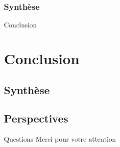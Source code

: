 \documentclass[english,french,dvips]{mybeamer}
\begin{document}
	\subsubsection{Synthèse}
	\begin{frame}{Conclusion}
	\end{frame}
	\section{Conclusion}
	\subsection{Synthèse}
	\subsection{Perspectives}
	\begin{frame}{Questions}
		Merci pour votre attention
	\end{frame}
\end{document}
